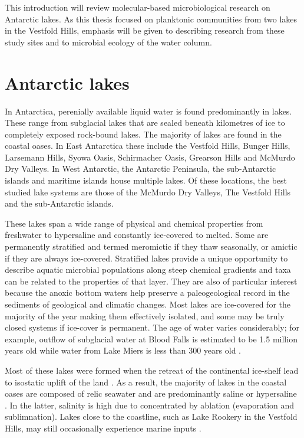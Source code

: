This introduction will review molecular-based microbiological research on Antarctic lakes.
As this thesis focused on planktonic communities from two lakes in the Vestfold Hills, emphasis will be given to describing research from these study sites and to microbial ecology of the water column.


\section{Antarctic lakes}
In Antarctica, perenially available liquid water is found predominantly in lakes.
These range from subglacial lakes that are sealed beneath kilometres of ice to completely exposed rock-bound lakes.
The majority of lakes are found in the coastal oases. 
In East Antarctica these include the Vestfold Hills, Bunger Hills, Larsemann Hills, Syowa Oasis, Schirmacher Oasis, Grearson Hills and McMurdo Dry Valleys.
In West Antarctic, the Antarctic Peninsula, the sub-Antarctic islands and maritime islands house multiple lakes. 
Of these locations, the best studied lake systems are those of the McMurdo Dry Valleys, The Vestfold Hills and the sub-Antarctic islands.

These lakes span a wide range of physical and chemical properties from freshwater to hypersaline and constantly ice-covered to melted.
Some are permanently stratified and termed meromictic if they thaw seasonally, or amictic if they are always ice-covered.
Stratified lakes provide a unique opportunity to describe aquatic microbial populations along steep chemical gradients and taxa can be related to the properties of that layer.  
They are also of particular interest because the anoxic bottom waters help preserve a paleogeological record in the sediments of geological and climatic changes.
Most lakes are ice-covered for the majority of the year making them effectively isolated, and some may be truly closed systems if ice-cover is permanent.
The age of water varies considerably; for example, outflow of subglacial water at Blood Falls is estimated to be 1.5 million years old \cite{Mikucki2009} while water from Lake Miers is less than 300 years old \cite{Green1988}. 

Most of these lakes were formed when the retreat of the continental ice-shelf lead to isostatic uplift of the land \cite{Burton1981}. %
As a result, the majority of lakes in the coastal oases are composed of relic seawater and are predominantly saline or hypersaline \cite{Burke1988}.
In the latter, salinity is high due to concentrated by ablation (evaporation and sublimnation). %
Lakes close to the coastline, such as Lake Rookery in the Vestfold Hills, may still occasionally experience marine inputs \cite{Burton1981}.

